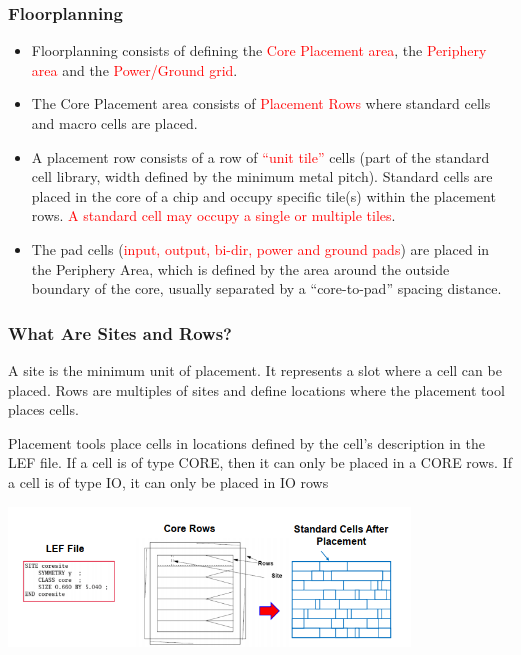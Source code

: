 \documentclass[compress]{beamer}
\begin{document}
	\begin{frame}
		\frametitle{Floorplanning}
		\begin{itemize}
			\item Floorplanning consists of defining the \textcolor{red}{Core Placement area}, the \textcolor{red}{Periphery area} and the \textcolor{red}{Power/Ground grid}.
			\item The Core Placement area consists of \textcolor{red}{Placement Rows} where standard cells and macro cells are
			placed.
			\item A placement row consists of a row of \textcolor{red}{“unit tile”} cells (part of the standard cell library, width
			defined by the minimum metal pitch). Standard cells are placed in the core of a chip and occupy
			specific tile(s) within the placement rows. \textcolor{red}{A standard cell may occupy a single or multiple tiles}.
			\item The pad cells (\textcolor{red}{input, output, bi-dir, power and ground pads}) are placed in the Periphery Area,
			which is defined by the area around the outside boundary of the core, usually separated by a
			“core-to-pad” spacing distance.
		\end{itemize}
	\end{frame}
\begin{frame}
	\frametitle{What Are Sites and Rows?}
	\begin{block}
	
	A site is the minimum unit of placement. It represents a slot where a cell can be placed.
	Rows are multiples of sites and define locations where the placement tool places cells.
	\end{block}
Placement tools place cells in locations defined by the cell’s description in the LEF file. If a cell is of type
CORE, then it can only be placed in a CORE rows. If a cell is of type IO, it can only be placed in IO rows
\begin{center}
	\includegraphics[width=0.8\textwidth]{SITE}
\end{center}
\end{frame}
\end{document}
